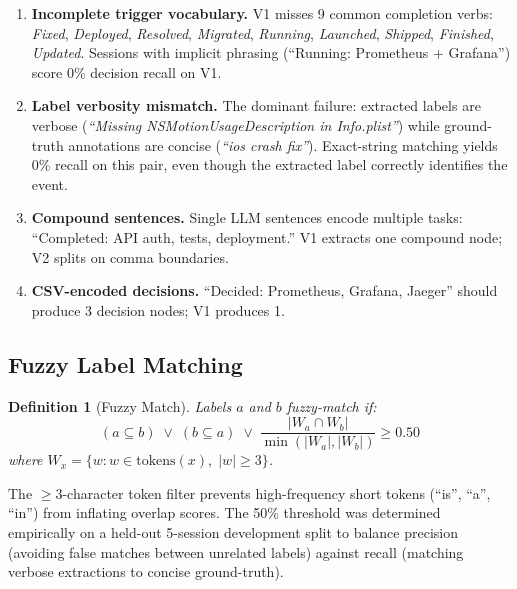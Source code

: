 \documentclass[journal]{IEEEtran}
\newtheorem{definition}{Definition}
\begin{document}
\begin{enumerate}
\item \textbf{Incomplete trigger vocabulary.}
  V1 misses 9 common completion verbs: \textit{Fixed},
  \textit{Deployed}, \textit{Resolved}, \textit{Migrated},
  \textit{Running}, \textit{Launched}, \textit{Shipped},
  \textit{Finished}, \textit{Updated}.
  Sessions with implicit phrasing (``Running: Prometheus +
  Grafana'') score 0\% decision recall on V1.

\item \textbf{Label verbosity mismatch.}
  The dominant failure: extracted labels are verbose
  (\textit{``Missing NSMotionUsageDescription in Info.plist''})
  while ground-truth annotations are concise
  (\textit{``ios crash fix''}).
  Exact-string matching yields 0\% recall on this pair,
  even though the extracted label correctly identifies the
  event.

\item \textbf{Compound sentences.}
  Single LLM sentences encode multiple tasks:
  ``Completed: API auth, tests, deployment.''
  V1 extracts one compound node; V2 splits on comma boundaries.

\item \textbf{CSV-encoded decisions.}
  ``Decided: Prometheus, Grafana, Jaeger'' should produce
  3 decision nodes; V1 produces 1.
\end{enumerate}

\subsection{Fuzzy Label Matching}
\label{sec:fuzzy}

\begin{definition}[Fuzzy Match]
\label{def:fuzzy}
Labels $a$ and $b$ fuzzy-match if:
\begin{equation}
  (a \subseteq b) \;\vee\; (b \subseteq a) \;\vee\;
  \frac{|W_a \cap W_b|}{\min(|W_a|, |W_b|)} \geq 0.50
  \label{eq:fuzzy}
\end{equation}
where $W_x = \{w : w \in \mathrm{tokens}(x),\; |w| \geq 3\}$.
\end{definition}

The $\geq$3-character token filter prevents high-frequency
short tokens (``is'', ``a'', ``in'') from inflating overlap
scores.
The 50\% threshold was determined empirically on a held-out
5-session development split to balance precision
(avoiding false matches between unrelated labels)
against recall (matching verbose extractions to concise
ground-truth).
\end{document}
